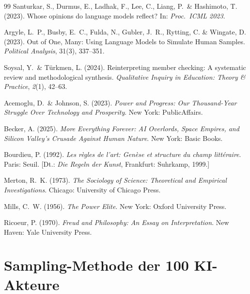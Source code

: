 \documentclass[12pt,a4paper]{article}
\begin{document}
\begin{thebibliography}{99}
  Santurkar, S., Durmus, E., Ladhak, F., Lee, C., Liang, P.~\& Hashimoto, T. (2023).
  Whose opinions do language models reflect?
  In: \textit{Proc.\ ICML 2023}.

  Argyle, L.~P., Busby, E.~C., Fulda, N., Gubler, J.~R., Rytting, C. \& Wingate, D. (2023).
  Out of One, Many: Using Language Models to Simulate Human Samples.
  \textit{Political Analysis}, 31(3), 337--351.

  Soysal, Y.~\& T\"urkmen, L. (2024).
  Reinterpreting member checking: A systematic review and methodological synthesis.
  \textit{Qualitative Inquiry in Education: Theory \& Practice}, \textit{2}(1), 42--63.

  Acemoglu, D.~\& Johnson, S. (2023).
  \textit{Power and Progress: Our Thousand-Year Struggle Over Technology and Prosperity}.
  New York: PublicAffairs.

  Becker, A. (2025).
  \textit{More Everything Forever: AI Overlords, Space Empires, and Silicon Valley's Crusade Against Human Nature}.
  New York: Basic Books.

  Bourdieu, P. (1992).
  \textit{Les r\`egles de l'art: Gen\`ese et structure du champ litt\'eraire}.
  Paris: Seuil.
  [Dt.: \textit{Die Regeln der Kunst}, Frankfurt: Suhrkamp, 1999.]

  Merton, R.~K. (1973).
  \textit{The Sociology of Science: Theoretical and Empirical Investigations}.
  Chicago: University of Chicago Press.

  Mills, C.~W. (1956).
  \textit{The Power Elite}.
  New York: Oxford University Press.

  Ricoeur, P. (1970).
  \textit{Freud and Philosophy: An Essay on Interpretation}.
  New Haven: Yale University Press.

\end{thebibliography}



\newpage
\appendix

\section{Sampling-Methode der 100 KI-Akteure}
\label{app:sampling}
\end{document}
